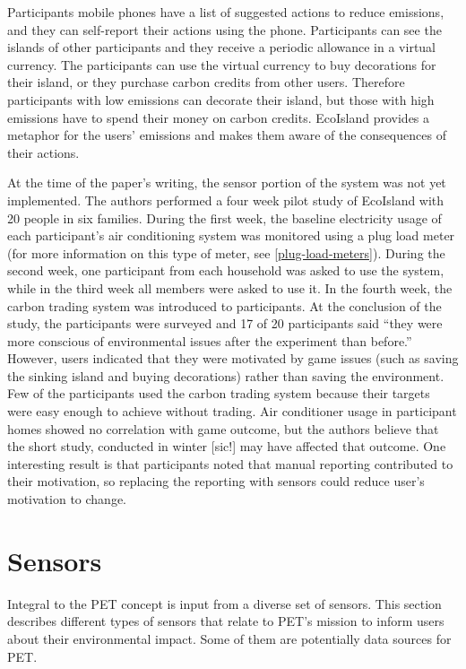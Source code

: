 Participants mobile phones have a list of suggested actions to reduce emissions, and they can self-report their actions using the phone. Participants can see the islands of other participants and they receive a periodic allowance in a virtual currency. The participants can use the virtual currency to buy decorations for their island, or they purchase carbon credits from other users. Therefore participants with low emissions can decorate their island, but those with high emissions have to spend their money on carbon credits. EcoIsland provides a metaphor for the users' emissions and makes them aware of the consequences of their actions.

At the time of the paper's writing, the sensor portion of the system was not yet implemented. The authors performed a four week pilot study of EcoIsland with 20 people in six families. During the first week, the baseline electricity usage of each participant's air conditioning system was monitored using a plug load meter (for more information on this type of meter, see \autoref{plug-load-meters}). During the second week, one participant from each household was asked to use the system, while in the third week all members were asked to use it. In the fourth week, the carbon trading system was introduced to participants. At the conclusion of the study, the participants were surveyed and 17 of 20 participants said ``they were more conscious of environmental issues after the experiment than before.'' However, users indicated that they were motivated by game issues (such as saving the sinking island and buying decorations) rather than saving the environment. Few of the participants used the carbon trading system because their targets were easy enough to achieve without trading. Air conditioner usage in participant homes showed no correlation with game outcome, but the authors believe that the short study, conducted in winter [sic!] may have affected that outcome. One interesting result is that participants noted that manual reporting contributed to their motivation, so replacing the reporting with sensors could reduce user's motivation to change.


\section{Sensors}
\label{sensor-section}

Integral to the PET concept is input from a diverse set of sensors. This section describes different types of sensors that relate to PET's mission to inform users about their environmental impact. Some of them are potentially data sources for PET.

